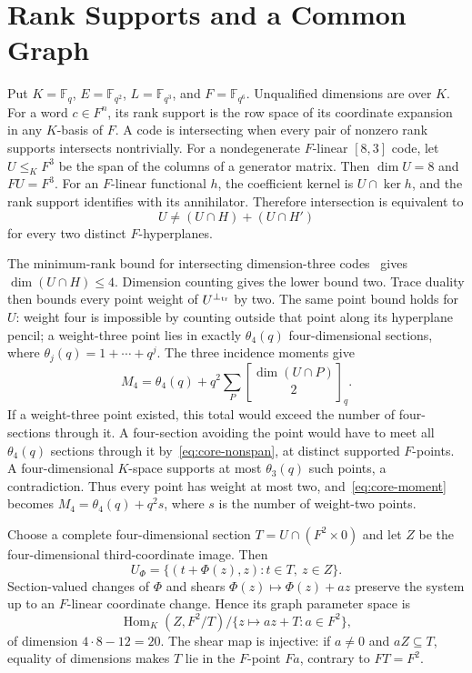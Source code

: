 \documentclass[12pt,letterpaper,onecolumn]{article}
\theoremstyle{definition}
\theoremstyle{remark}
\DeclareMathOperator{\Hom}{Hom}
\newcommand{\F}{\mathbb F}
\begin{document}
\section{Rank Supports and a Common Graph}
Put \(K=\F_q\), \(E=\F_{q^2}\), \(L=\F_{q^3}\), and \(F=\F_{q^6}\).
Unqualified dimensions are over \(K\). For a word \(c\in F^n\), its rank support is the row space of its coordinate expansion in any \(K\)-basis of \(F\). A code is intersecting when every pair of nonzero rank supports intersects nontrivially.
For a nondegenerate \(F\)-linear \([8,3]\) code, let \(U\le_KF^3\) be the span of the columns of a generator matrix. Then \(\dim U=8\) and \(FU=F^3\).
For an \(F\)-linear functional \(h\), the coefficient kernel is \(U\cap\ker h\), and the rank support identifies with its annihilator. Therefore intersection is equivalent to
\begin{equation}\label{eq:core-nonspan}
U\ne(U\cap H)+(U\cap H')
\end{equation}
for every two distinct \(F\)-hyperplanes.

The minimum-rank bound for intersecting dimension-three codes~\cite{bpz} gives \(\dim(U\cap H)\le4\). Dimension counting gives the lower bound two. Trace duality then bounds every point weight of \(U^{\perp_{\rm tr}}\) by two. The same point bound holds for \(U\):
weight four is impossible by counting outside that point along its hyperplane pencil; a weight-three point lies in exactly \(\theta_4(q)\) four-dimensional sections, where \(\theta_j(q)=1+\cdots+q^j\).
The three incidence moments give
\begin{equation}\label{eq:core-moment}
M_4=\theta_4(q)+q^2\sum_P{\dim(U\cap P)\brack2}_q.
\end{equation}
If a weight-three point existed, this total would exceed the number of four-sections through it. A four-section avoiding the point would have to meet all \(\theta_4(q)\) sections through it by~\eqref{eq:core-nonspan}, at distinct supported \(F\)-points. A four-dimensional \(K\)-space supports at most \(\theta_3(q)\) such points, a contradiction.
Thus every point has weight at most two, and~\eqref{eq:core-moment} becomes
\(M_4=\theta_4(q)+q^2s\), where \(s\) is the number of weight-two points.

Choose a complete four-dimensional section \(T=U\cap(F^2\times0)\) and let \(Z\) be the four-dimensional third-coordinate image. Then
\[
U_\Phi=\{(t+\Phi(z),z):t\in T,\ z\in Z\}.
\]
Section-valued changes of \(\Phi\) and shears \(\Phi(z)\mapsto\Phi(z)+az\) preserve the system up to an \(F\)-linear coordinate change. Hence its graph parameter space is
\begin{equation}\label{eq:core-graphquot}
\Hom_K(Z,F^2/T)/\{z\mapsto az+T:a\in F^2\},
\end{equation}
of dimension \(4\cdot8-12=20\). The shear map is injective: if \(a\ne0\) and \(aZ\subseteq T\), equality of dimensions makes \(T\) lie in the \(F\)-point \(Fa\), contrary to \(FT=F^2\).
\end{document}
